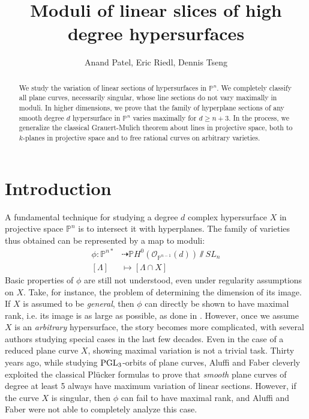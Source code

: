 \documentclass[11pt,reqno]{amsart}
\title{Moduli of linear slices of high degree hypersurfaces}
\author{Anand Patel, Eric Riedl, Dennis Tseng}
\theoremstyle{plain}
\theoremstyle{definition}
\theoremstyle{remark}
\numberwithin{equation}{section}
\numberwithin{equation}{section}
\newcommand{\OO}{\mathscr{O}}
\newcommand{\PP}{\mathbb{P}}
\newcommand{\git}{\sslash}
\begin{document}
\maketitle

\begin{abstract}
We study the variation of linear sections of hypersurfaces in $\PP^n$. We completely classify all plane curves, necessarily singular, whose line sections do not vary maximally in moduli. In higher dimensions, we prove that the family of hyperplane sections of any smooth degree $d$ hypersurface in $\PP^n$ varies  maximally for $d \geq n+3$. In the process, we generalize the classical Grauert-Mulich theorem about lines in projective space, both to $k$-planes in projective space and to free rational curves on arbitrary varieties.
\end{abstract}

\section{Introduction}
A fundamental technique for studying a degree $d$ complex hypersurface $X$ in projective space $\PP^n$ is to intersect it with hyperplanes.  The family of varieties thus obtained can be represented by a map to moduli:
\begin{align*}
    \phi: \mathbb{P}^{n*}&\dashrightarrow \PP H^0(\OO_{\PP^{n-1}}(d))\git SL_{n} \\
    [\Lambda] &\mapsto [\Lambda\cap X]
\end{align*}
 Basic properties of $\phi$ are still not understood, even under regularity assumptions on $X$.  Take, for instance, the problem of determining the dimension of its image.  If $X$ is assumed to be {\sl general}, then $\phi$ can directly be shown to have maximal rank, i.e. its image is as large as possible, as done in \cite{opstallveliche}. However, once we assume $X$ is an {\sl arbitrary} hypersurface, the story becomes more complicated, with several authors studying special cases in the last few decades.  Even in the case of a reduced plane curve $X$, showing maximal variation is not a trivial task. Thirty years ago, while studying $\operatorname{PGL}_3$-orbits of plane curves, Aluffi and Faber \cite[Proposition 4.2]{AF93P} cleverly exploited the classical Pl\"ucker formulas to prove that {\sl smooth} plane curves of degree at least 5 always have maximum variation of linear sections.   However, if the curve $X$ is singular, then $\phi$ can fail to have maximal rank, and Aluffi and Faber were not able to completely analyze this case.
\end{document}
